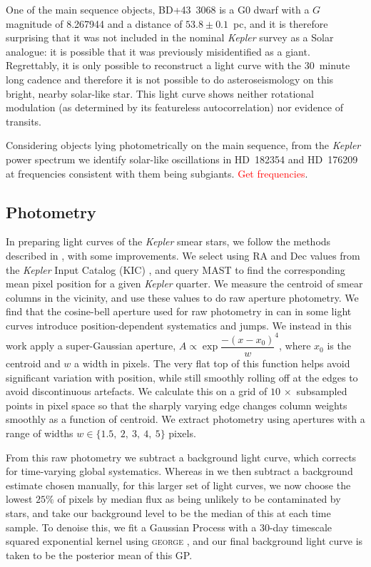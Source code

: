 \documentclass[a4paper,fleqn,usenatbib]{mnras}
\newcommand{\kepler}{\emph{Kepler}\xspace}
\begin{document}
One of the main sequence objects, BD+43~3068 is a G0 dwarf with a $G$ magnitude of 8.267944 and a distance of $53.8 \pm 0.1$~pc, and it is therefore surprising that it was not included in the nominal \kepler survey as a Solar analogue: it is possible that it was previously misidentified as a giant. Regrettably, it is only possible to reconstruct a light curve with the 30~minute long cadence and therefore it is not possible to do asteroseismology on this bright, nearby solar-like star. This light curve shows neither rotational modulation (as determined by its featureless autocorrelation) nor evidence of transits.

Considering objects lying photometrically on the main sequence, from the \kepler power spectrum we identify solar-like oscillations in HD~182354 and HD~176209 at frequencies consistent with them being subgiants. \textcolor{red}{Get frequencies}.


\subsection{Photometry}
\label{photometry}

In preparing light curves of the \kepler smear stars, we follow the methods described in \citet{smear}, with some improvements. We select using RA and Dec values from the \kepler Input Catalog (KIC) \citep{kic}, and query MAST to find the corresponding mean pixel position for a given \kepler quarter. We measure the centroid of smear columns in the vicinity, and use these values to do raw aperture photometry. We find that the cosine-bell aperture used for raw photometry in \citet{smear} can in some light curves introduce position-dependent systematics and jumps. We instead in this work apply a super-Gaussian aperture, $A \propto \exp{\dfrac{-(x-x_0)}{w} ^ 4}$, where $x_0$ is the centroid and $w$ a width in pixels. The very flat top of this function helps avoid significant variation with position, while still smoothly rolling off at the edges to avoid discontinuous artefacts. We calculate this on a grid of $10\,\times$ subsampled points in pixel space so that the sharply varying edge changes column weights smoothly as a function of centroid. We extract photometry using apertures with a range of widths $w \in\{1.5,~2,~3,~4,~5\}$ pixels.

From this raw photometry we subtract a background light curve, which corrects for time-varying global systematics. Whereas in \citet{smear} we then subtract a background estimate chosen manually, for this larger set of light curves, we now choose the lowest $25\%$ of pixels by median flux as being unlikely to be contaminated by stars, and take our background level to be the median of this at each time sample. To denoise this, we fit a Gaussian Process with a 30-day timescale squared exponential kernel using \textsc{george} \citep{hodlr}, and our final background light curve is taken to be the posterior mean of this GP. 
\end{document}
